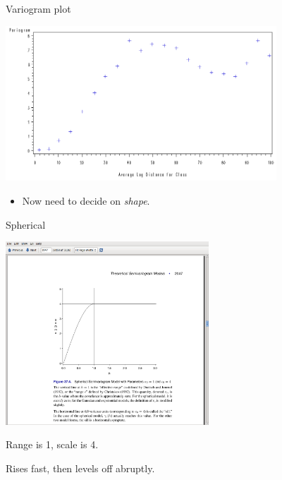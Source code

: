 \begin{frame}{Variogram plot}

\includegraphics[width=4in]{variog1}

\pause

\begin{itemize}
\item Now need to decide on \textit{shape}.
\end{itemize}
  
\end{frame}

\begin{frame}{Spherical}

\includegraphics[width=3in]{spherical-model}

Range is 1, scale is 4.

Rises fast, then levels off abruptly.

\end{frame}

